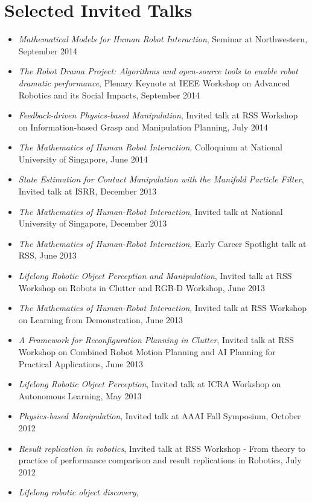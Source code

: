 \documentclass[10pt]{article}
\begin{document}
\section{Selected Invited Talks}
\begin{itemize}
\addtolength{\itemsep}{-0.5\baselineskip}
\item \textit{Mathematical Models for Human Robot Interaction},
Seminar at Northwestern, September 2014
\item \textit{The Robot Drama Project: Algorithms and open-source tools to enable robot dramatic performance},
Plenary Keynote at IEEE Workshop on Advanced Robotics and its Social Impacts, September 2014
\item \textit{Feedback-driven Physics-based Manipulation},
Invited talk at RSS Workshop on Information-based Grasp and Manipulation Planning, July 2014
\item \textit{The Mathematics of Human Robot Interaction},
Colloquium at National University of Singapore, June 2014
\item \textit{State Estimation for Contact Manipulation with the Manifold Particle Filter},
Invited talk at ISRR, December 2013
\item \textit{The Mathematics of Human-Robot Interaction},
Invited talk at National University of Singapore, December 2013
\item \textit{The Mathematics of Human-Robot Interaction},
Early Career Spotlight talk at RSS, June 2013
\item \textit{Lifelong Robotic Object Perception and Manipulation},
Invited talk at RSS Workshop on Robots in Clutter and RGB-D Workshop, June 2013
\item \textit{The Mathematics of Human-Robot Interaction},
Invited talk at RSS Workshop on Learning from Demonstration, June 2013
\item \textit{A Framework for Reconfiguration Planning in Clutter},
Invited talk at RSS Workshop on Combined Robot Motion Planning and AI Planning for Practical Applications, June 2013
\item \textit{Lifelong Robotic Object Perception},
Invited talk at ICRA Workshop on Autonomous Learning, May 2013
\item \textit{Physics-based Manipulation},
Invited talk at AAAI Fall Symposium, October 2012
\item \textit{Result replication in robotics},
Invited talk at RSS Workshop - From theory to practice of performance comparison and result replications in Robotics, July 2012
\item \textit{Lifelong robotic object discovery},

\end{itemize}
\end{document}
